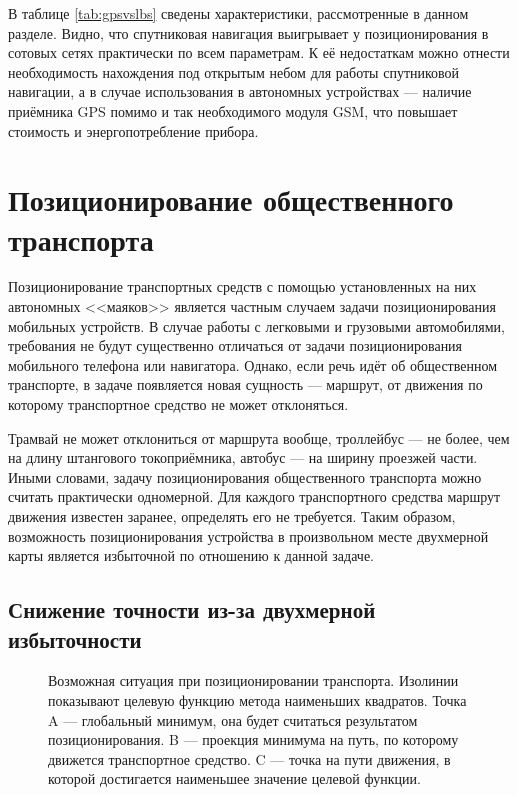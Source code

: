 В таблице \ref{tab:gpsvslbs} сведены характеристики, рассмотренные в данном разделе. Видно, что спутниковая навигация выигрывает у позиционирования в сотовых сетях практически по всем параметрам. К её недостаткам можно отнести необходимость нахождения под открытым небом для работы спутниковой навигации, а в случае использования в автономных устройствах --- наличие приёмника GPS помимо и так необходимого модуля GSM, что повышает стоимость и энергопотребление прибора.

\section{Позиционирование общественного транспорта}

Позиционирование транспортных средств с помощью установленных на них автономных <<маяков>> является частным случаем задачи позиционирования мобильных устройств. В случае работы с легковыми и грузовыми автомобилями, требования не будут существенно отличаться от задачи позиционирования мобильного телефона или навигатора. Однако, если речь идёт об общественном транспорте, в задаче появляется новая сущность --- маршрут, от движения по которому транспортное средство не может отклоняться.

Трамвай не может отклониться от маршрута вообще, троллейбус --- не более, чем на длину штангового токоприёмника, автобус --- на ширину проезжей части. Иными словами, задачу позиционирования общественного транспорта можно считать практически одномерной. Для каждого транспортного средства маршрут движения известен заранее, определять его не требуется. Таким образом, возможность позиционирования устройства в произвольном месте двухмерной карты является избыточной по отношению к данной задаче.

\subsection{Снижение точности из-за двухмерной избыточности}
\label{subsec:2dlowprec}
\begin{figure}[h]
	\caption{Возможная ситуация при позиционировании транспорта. Изолинии показывают целевую функцию метода наименьших квадратов. Точка A --- глобальный минимум, она будет считаться результатом позиционирования. B --- проекция минимума на путь, по которому движется транспортное средство. C --- точка на пути движения, в которой достигается наименьшее значение целевой функции.}
	\label{fig:contour}
\end{figure}

